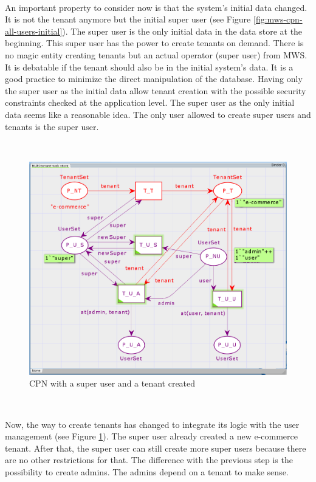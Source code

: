 \documentclass[12pt,english]{article} %
\begin{document}
\

An important property to consider now is that the system's initial data changed. 
It is not the tenant anymore but the initial super user (see Figure \ref{fig:mws-cpn-all-users-initial}).
The super user is the only initial data in the data store at the beginning.
This super user has the power to create tenants on demand.
There is no magic entity creating tenants but an actual operator (super user) from MWS.
It is debatable if the tenant should also be in the initial system's data.
It is a good practice to minimize the direct manipulation of the database.
Having only the super user as the initial data allow tenant creation with the possible security constraints checked at the application level.
The super user as the only initial data seems like a reasonable idea.
The only user allowed to create super users and tenants is the super user.

\

\begin{figure}[H]
    \centering
    \includegraphics[scale=0.55]{img/mws/cpn/mws_cpn_super_tenant_created.png}
    \caption{CPN with a super user and a tenant created}
    \label{fig:mws-cpn-super-tenant-created}
\end{figure}

\

Now, the way to create tenants has changed to integrate its logic with the user management (see Figure \ref{fig:mws-cpn-super-tenant-created}).
The super user already created a new e-commerce tenant.
After that, the super user can still create more super users because there are no other restrictions for that.
The difference with the previous step is the possibility to create admins.
The admins depend on a tenant to make sense.
\end{document}
